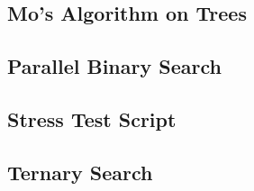 \subsection{Mo's Algorithm on Trees}
\raggedbottom
\hrulefill
\subsection{Parallel Binary Search}
\raggedbottom
\hrulefill
\subsection{Stress Test Script}
\raggedbottom
\hrulefill
\subsection{Ternary Search}
\raggedbottom
\hrulefill

